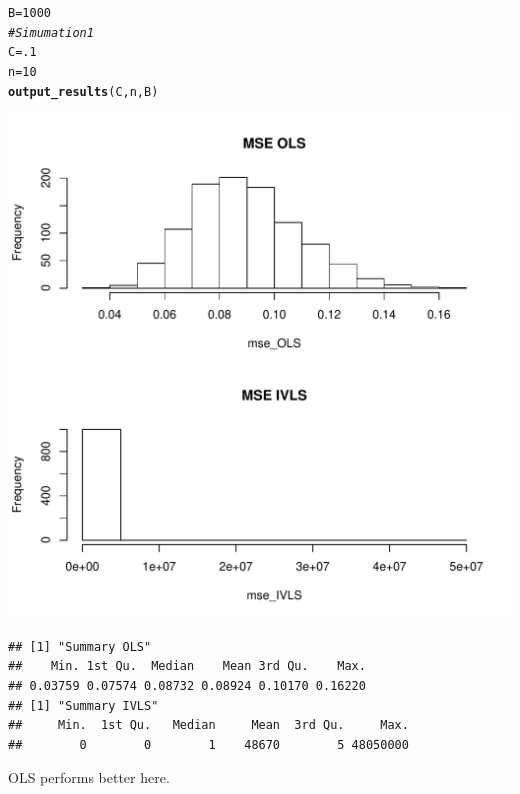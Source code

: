 \documentclass[11pt]{article}\usepackage[]{graphicx}\usepackage[]{color}
\makeatletter
\def\maxwidth{ %
  \ifdim\Gin@nat@width>\linewidth
    \linewidth
  \else
    \Gin@nat@width
  \fi
}
\newcommand{\hlnum}[1]{\textcolor[rgb]{0.686,0.059,0.569}{#1}}%
\newcommand{\hlcom}[1]{\textcolor[rgb]{0.678,0.584,0.686}{\textit{#1}}}%
\newcommand{\hlstd}[1]{\textcolor[rgb]{0.345,0.345,0.345}{#1}}%
\newcommand{\hlkwb}[1]{\textcolor[rgb]{0.69,0.353,0.396}{#1}}%
\newcommand{\hlkwd}[1]{\textcolor[rgb]{0.737,0.353,0.396}{\textbf{#1}}}%
\newenvironment{kframe}{%
 \def\at@end@of@kframe{}%
 \ifinner\ifhmode%
  \def\at@end@of@kframe{\end{minipage}}%
  \begin{minipage}{\columnwidth}%
 \fi\fi%
 \def\FrameCommand##1{\hskip\@totalleftmargin \hskip-\fboxsep
 \colorbox{shadecolor}{##1}\hskip-\fboxsep
     \hskip-\linewidth \hskip-\@totalleftmargin \hskip\columnwidth}%
 \MakeFramed {\advance\hsize-\width
   \@totalleftmargin\z@ \linewidth\hsize
   \@setminipage}}%
 {\par\unskip\endMakeFramed%
 \at@end@of@kframe}
\newenvironment{knitrout}{}{} %
\makeatother
\begin{document}
\begin{knitrout}
\color{fgcolor}\begin{kframe}
\begin{alltt}
\hlstd{B}\hlkwb{=}\hlnum{1000}
\hlcom{# Simumation 1}
\hlstd{C}\hlkwb{=}\hlnum{.1}
\hlstd{n}\hlkwb{=}\hlnum{10}
\hlkwd{output_results}\hlstd{(C,n,B)}
\end{alltt}
\end{kframe}
\includegraphics[width=\maxwidth]{figure/unnamed-chunk-4-1} 
\begin{kframe}\begin{lstlisting}[basicstyle=\ttfamily,breaklines=true]
## [1] "Summary OLS"
##    Min. 1st Qu.  Median    Mean 3rd Qu.    Max. 
## 0.03759 0.07574 0.08732 0.08924 0.10170 0.16220 
## [1] "Summary IVLS"
##     Min.  1st Qu.   Median     Mean  3rd Qu.     Max. 
##        0        0        1    48670        5 48050000
\end{lstlisting}
\end{kframe}
\end{knitrout}
OLS performs better here.
\end{document}
